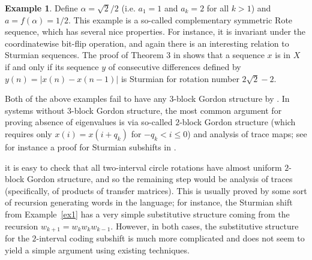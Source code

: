 \documentclass[11pt,reqno]{amsart}
\theoremstyle{definition}
\newtheorem{example}[theorem]{Example}
\theoremstyle{plain}
\begin{document}
\begin{example}
Define $\alpha = \sqrt{2}/2$ (i.e. $a_1 = 1$ and $a_k = 2$ for all $k > 1$) and 
$a = f(\alpha) = 1/2$. This example is a so-called complementary symmetric Rote sequence, which has several nice properties. For instance, it is invariant under the coordinatewise bit-flip operation, and again there is an interesting relation to Sturmian sequences. The proof of Theorem 3 in \cite{rote} shows that a sequence $x$ is in $X$ if and only if its sequence $y$ of consecutive differences defined by $y(n) = |x(n) - x(n - 1)|$ is Sturmian for rotation number $2 \sqrt{2} - 2$.

\end{example}

Both of the above examples fail to have any $3$-block Gordon structure by .
In systems without $3$-block Gordon structure, the most common argument for proving absence of eigenvalues is via so-called $2$-block Gordon structure (which requires only $x(i) = x(i + q_k)$ for $-q_k < i \leq 0$) and analysis of trace maps; see for instance a proof for Sturmian subshifts in \cite{sturm}. 

it is easy to check that all two-interval circle rotations have almost uniform $2$-block Gordon structure, and so the remaining step would be analysis of traces (specifically, of products of transfer matrices). This is usually proved by some sort of recursion generating words in the language; for instance, the Sturmian shift from Example~\ref{ex1} has a very simple substitutive structure coming from the recursion $w_{k+1} = w_k w_k w_{k-1}$. However, in both cases, the substitutive structure for the $2$-interval coding subshift is much more complicated and does not seem to yield a simple argument using existing techniques.






\end{document}
